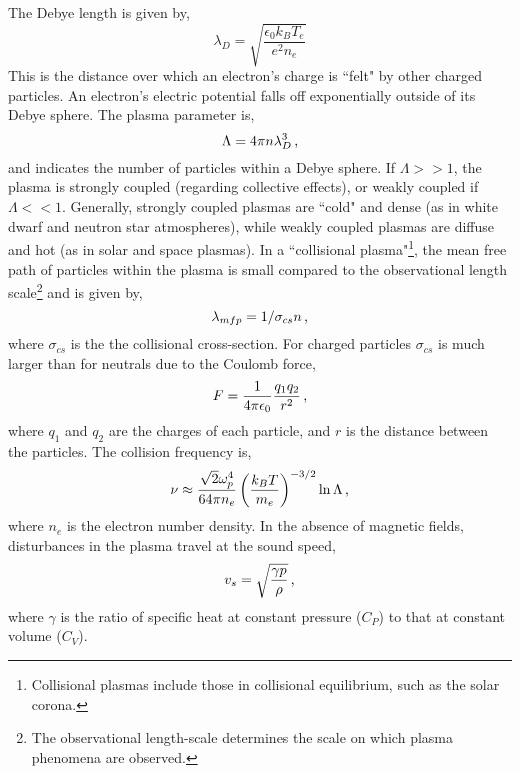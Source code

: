The Debye length is given by,
\begin{equation}
\lambda_D = \sqrt{\frac{\epsilon_0 k_B T_e}{e^2 n_e}}  
\end{equation}
This is the distance over which an electron's charge is ``felt" by other charged particles. An electron's electric potential falls off exponentially outside of its Debye sphere. The plasma parameter is, 
\begin{equation}
\Lambda = 4 \pi n \lambda_D^3 \mbox{\,,}
\end{equation}
and indicates the number of particles within a Debye sphere. If $\Lambda >> 1$, the plasma is strongly coupled (regarding collective effects), or weakly coupled if $\Lambda << 1$. Generally, strongly coupled plasmas are ``cold" and dense (as in white dwarf and neutron star atmospheres), while weakly coupled plasmas are diffuse and hot (as in solar and space plasmas).
In a ``collisional plasma"\footnote{Collisional plasmas include those in collisional equilibrium, such as the solar corona.}, the mean free path of particles within the plasma is small compared to the observational length scale\footnote{The observational length-scale determines the scale on which plasma phenomena are observed.} and is given by,
\begin{equation}
\lambda_{mfp} = 1/\sigma_{cs} n \mbox{\,,}
\end{equation}
where $\sigma_{cs}$ is the the collisional cross-section. For charged particles $\sigma_{cs}$ is much larger than for neutrals due to the Coulomb force,
\begin{equation}
F = \frac{1}{4\pi \epsilon_0}\frac{q_1 q_2}{r^2} \mbox{\,,}
\end{equation}
where $q_1$ and $q_2$ are the charges of each particle, and $r$ is the distance between the particles.
The collision frequency is,
\begin{equation}
\nu \approx \frac{\sqrt{2} \omega_p^4}{64 \pi n_e} \left( \frac{k_B T}{m_e} \right)^{-3/2} \ln \Lambda \mbox{\,,}
\end{equation}
where $n_e$ is the electron number density. 
In the absence of magnetic fields, disturbances in the plasma travel at the sound speed,
\begin{equation}
v_s = \sqrt{\frac{\gamma p}{\rho}} \mbox{\,,}
\end{equation}
where $\gamma$ is the ratio of specific heat at constant pressure ($C_P$) to that at constant volume ($C_V$).


